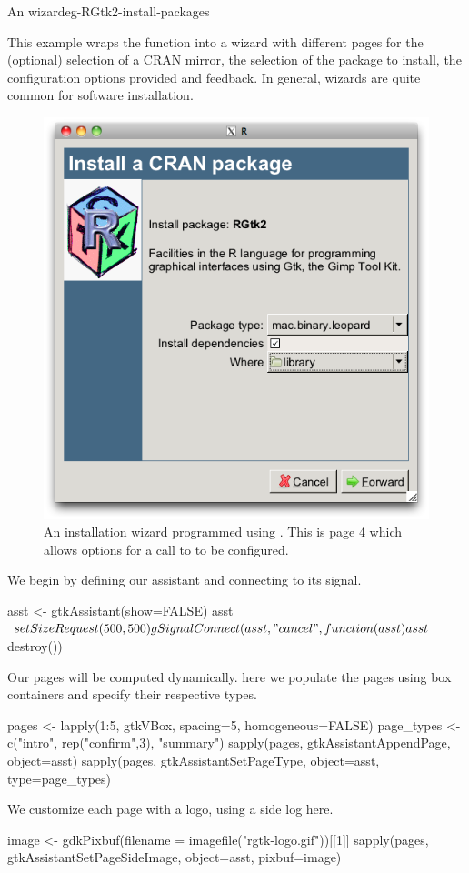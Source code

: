 \begin{example}{An  wizard}{eg-RGtk2-install-packages}

This example wraps the  function into a
wizard with different pages for the (optional) selection of a CRAN
mirror, the selection of the package to install, the configuration
options provided and feedback. In general, wizards are quite common
for software installation.

\begin{figure}
  \centering
  \includegraphics[width=.6\textwidth]{fig-RGtk2-install-wizard.png}
  \caption{An installation wizard programmed using
    . This is page 4 which allows options for a
    call to  to be configured.}
  \label{fig:RGtk2-install-wizard}
\end{figure}


We begin by defining our assistant and connecting to its
 signal.
\begin{Schunk}
\begin{Sinput}
 asst <- gtkAssistant(show=FALSE)
 asst$setSizeRequest(500, 500)
 gSignalConnect(asst, "cancel", function(asst) asst$destroy())
\end{Sinput}
\end{Schunk}

Our pages will be computed dynamically. here we populate the pages
using box containers and specify their respective types. 
\begin{Schunk}
\begin{Sinput}
 pages <- lapply(1:5, gtkVBox, spacing=5, homogeneous=FALSE)
 page_types <- c("intro", rep("confirm",3), "summary")
 sapply(pages, gtkAssistantAppendPage, object=asst)
 sapply(pages, gtkAssistantSetPageType, object=asst, 
        type=page_types)
\end{Sinput}
\end{Schunk}
%
We customize each page with a logo, using a side log here.
\begin{Schunk}
\begin{Sinput}
 image <- gdkPixbuf(filename = imagefile("rgtk-logo.gif"))[[1]]
 sapply(pages, gtkAssistantSetPageSideImage, object=asst, 
        pixbuf=image)
\end{Sinput}
\end{Schunk}


\end{example}
